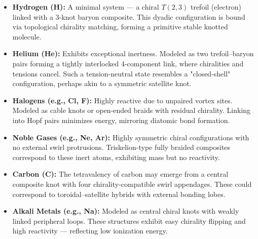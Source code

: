 \documentclass[a4paper,12pt]{article}
\begin{document}
\begin{itemize}
    \item \textbf{Hydrogen (H):} A minimal system — a chiral $T(2,3)$ trefoil (electron) linked with a 3-knot baryon composite. This dyadic configuration is bound via topological chirality matching, forming a primitive stable knotted molecule.

    \item \textbf{Helium (He):} Exhibits exceptional inertness. Modeled as two trefoil–baryon pairs forming a tightly interlocked 4-component link, where chiralities and tensions cancel. Such a tension-neutral state resembles a "closed-shell" configuration, perhaps akin to a symmetric satellite knot.

    \item \textbf{Halogens (e.g., Cl, F):} Highly reactive due to unpaired vortex sites. Modeled as cable knots or open-ended braids with residual chirality. Linking into Hopf pairs minimizes energy, mirroring diatomic bond formation.

    \item \textbf{Noble Gases (e.g., Ne, Ar):} Highly symmetric chiral configurations with no external swirl protrusions. Triskelion-type fully braided composites correspond to these inert atoms, exhibiting mass but no reactivity.

    \item \textbf{Carbon (C):} The tetravalency of carbon may emerge from a central composite knot with four chirality-compatible swirl appendages. These could correspond to toroidal–satellite hybrids with external bonding lobes.

    \item \textbf{Alkali Metals (e.g., Na):} Modeled as central chiral knots with weakly linked peripheral loops. These structures exhibit easy chirality flipping and high reactivity — reflecting low ionization energy.
\end{itemize}
\end{document}
